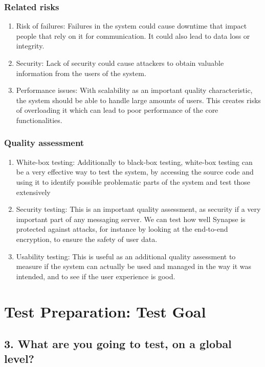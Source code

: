 \documentclass{article}
\begin{document}
\subsubsection*{Related risks}
\begin{enumerate}
    \item Risk of failures: Failures in the system could cause downtime that impact people that rely on it for communication. It could also lead to data loss or integrity.
    \item Security: Lack of security could cause attackers to obtain valuable information from the users of the system.
    \item Performance issues: With scalability as an important quality characteristic, the system should be able to handle large amounts of users. This creates risks of overloading it which can lead to poor performance of the core functionalities.
\end{enumerate}
\subsubsection*{Quality assessment}
\begin{enumerate}
    \item White-box testing: Additionally to black-box testing, white-box testing can be a very effective way to test the system, by accessing the source code and using it to identify possible problematic parts of the system and test those extensively 
    \item Security testing: This is an important quality assessment, as security if a very important part of any messaging server. We can test how well Synapse is protected against attacks, for instance by looking at the end-to-end encryption, to ensure the safety of user data. 
    \item Usability testing: This is useful as an additional quality assessment to measure if the system can actually be used and managed in the way it was intended, and to see if the user experience is good.
\end{enumerate}

\section*{Test Preparation: Test Goal}
\subsection*{3. What are you going to test, on a global level?}
\end{document}
